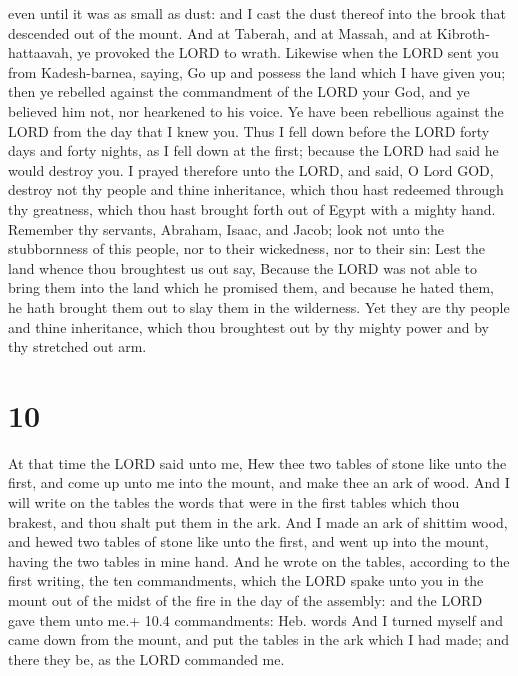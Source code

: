 even until it was as small as dust: and I cast the dust thereof into the
brook that descended out of the mount.  And at Taberah, and
at Massah, and at Kibroth-hattaavah, ye provoked the LORD to wrath.
 Likewise when the LORD sent you from Kadesh-barnea,
saying, Go up and possess the land which I have given you; then ye
rebelled against the commandment of the LORD your God, and ye believed
him not, nor hearkened to his voice.  Ye have been
rebellious against the LORD from the day that I knew you. 
Thus I fell down before the LORD forty days and forty nights, as I fell
down at the first; because the LORD had said he would destroy you.
 I prayed therefore unto the LORD, and said, O Lord GOD,
destroy not thy people and thine inheritance, which thou hast redeemed
through thy greatness, which thou hast brought forth out of Egypt with a
mighty hand.  Remember thy servants, Abraham, Isaac, and
Jacob; look not unto the stubbornness of this people, nor to their
wickedness, nor to their sin:  Lest the land whence thou
broughtest us out say, Because the LORD was not able to bring them into
the land which he promised them, and because he hated them, he hath
brought them out to slay them in the wilderness.  Yet they
are thy people and thine inheritance, which thou broughtest out by thy
mighty power and by thy stretched out arm.

\hypertarget{section-9}{%
\section{10}\label{section-9}}

 At that time the LORD said unto me, Hew thee two tables of
stone like unto the first, and come up unto me into the mount, and make
thee an ark of wood.  And I will write on the tables the
words that were in the first tables which thou brakest, and thou shalt
put them in the ark.  And I made an ark of shittim wood, and
hewed two tables of stone like unto the first, and went up into the
mount, having the two tables in mine hand.  And he wrote on
the tables, according to the first writing, the ten commandments, which
the LORD spake unto you in the mount out of the midst of the fire in the
day of the assembly: and the LORD gave them unto me.+ 10.4 commandments:
Heb. words  And I turned myself and came down from the
mount, and put the tables in the ark which I had made; and there they
be, as the LORD commanded me.

